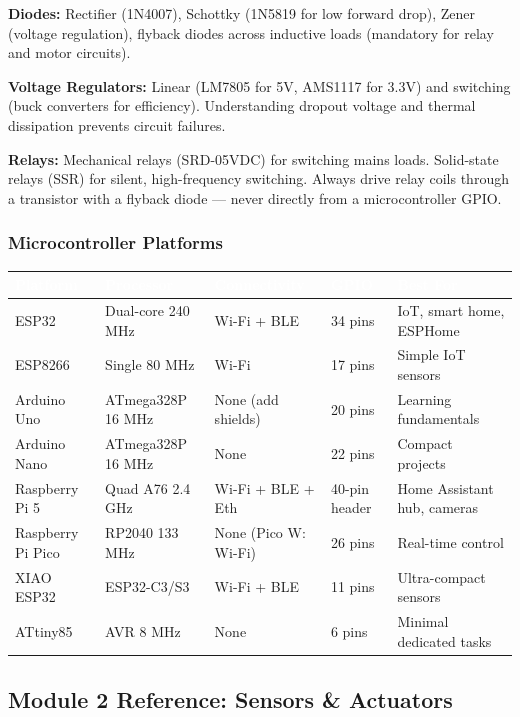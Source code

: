 \documentclass[11pt,letterpaper]{article}
\newcommand{\tableheader}[1]{\textbf{\sffamily\textcolor{white}{#1}}}
\begin{document}
\textbf{Diodes:} Rectifier (1N4007), Schottky (1N5819 for low forward drop), Zener (voltage regulation), flyback diodes across inductive loads (mandatory for relay and motor circuits).

\textbf{Voltage Regulators:} Linear (LM7805 for 5V, AMS1117 for 3.3V) and switching (buck converters for efficiency). Understanding dropout voltage and thermal dissipation prevents circuit failures.

\textbf{Relays:} Mechanical relays (SRD-05VDC) for switching mains loads. Solid-state relays (SSR) for silent, high-frequency switching. Always drive relay coils through a transistor with a flyback diode --- never directly from a microcontroller GPIO.

\subsubsection{Microcontroller Platforms}

\begin{center}
\begin{tabularx}{\textwidth}{L{2.5cm}L{2cm}L{2cm}L{2cm}X}
\toprule
{}
\tableheader{Platform} & \tableheader{Processor} & \tableheader{Connectivity} & \tableheader{GPIO} & \tableheader{Best For} \\
\midrule
ESP32 & Dual-core 240 MHz & Wi-Fi + BLE & 34 pins & IoT, smart home, ESPHome \\
ESP8266 & Single 80 MHz & Wi-Fi & 17 pins & Simple IoT sensors \\
Arduino Uno & ATmega328P 16 MHz & None (add shields) & 20 pins & Learning fundamentals \\
Arduino Nano & ATmega328P 16 MHz & None & 22 pins & Compact projects \\
Raspberry Pi 5 & Quad A76 2.4 GHz & Wi-Fi + BLE + Eth & 40-pin header & Home Assistant hub, cameras \\
Raspberry Pi Pico & RP2040 133 MHz & None (Pico W: Wi-Fi) & 26 pins & Real-time control \\
XIAO ESP32 & ESP32-C3/S3 & Wi-Fi + BLE & 11 pins & Ultra-compact sensors \\
ATtiny85 & AVR 8 MHz & None & 6 pins & Minimal dedicated tasks \\
\bottomrule
\end{tabularx}
\end{center}

\subsection{Module 2 Reference: Sensors \& Actuators}
\end{document}
